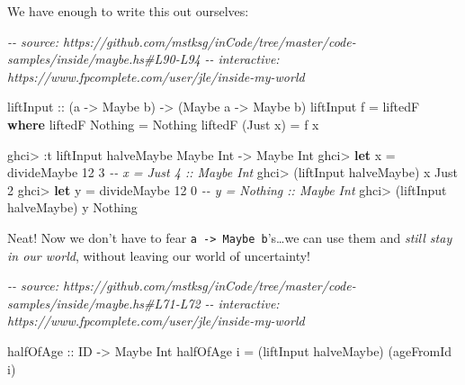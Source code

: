 \documentclass[]{article}
\newenvironment{Shaded}{}{}
\newcommand{\CommentTok}[1]{\textcolor[rgb]{0.38,0.63,0.69}{\textit{#1}}}
\newcommand{\DataTypeTok}[1]{\textcolor[rgb]{0.56,0.13,0.00}{#1}}
\newcommand{\DecValTok}[1]{\textcolor[rgb]{0.25,0.63,0.44}{#1}}
\newcommand{\KeywordTok}[1]{\textcolor[rgb]{0.00,0.44,0.13}{\textbf{#1}}}
\newcommand{\NormalTok}[1]{#1}
\newcommand{\OperatorTok}[1]{\textcolor[rgb]{0.40,0.40,0.40}{#1}}
\newcommand{\OtherTok}[1]{\textcolor[rgb]{0.00,0.44,0.13}{#1}}
\begin{document}
We have enough to write this out ourselves:

\begin{Shaded}
\begin{Highlighting}[]
\CommentTok{{-}{-} source: https://github.com/mstksg/inCode/tree/master/code{-}samples/inside/maybe.hs\#L90{-}L94}
\CommentTok{{-}{-} interactive: https://www.fpcomplete.com/user/jle/inside{-}my{-}world}

\OtherTok{liftInput ::}\NormalTok{ (a }\OtherTok{{-}\textgreater{}} \DataTypeTok{Maybe}\NormalTok{ b) }\OtherTok{{-}\textgreater{}}\NormalTok{ (}\DataTypeTok{Maybe}\NormalTok{ a }\OtherTok{{-}\textgreater{}} \DataTypeTok{Maybe}\NormalTok{ b)}
\NormalTok{liftInput f }\OtherTok{=}\NormalTok{ liftedF}
  \KeywordTok{where}
\NormalTok{    liftedF }\DataTypeTok{Nothing}  \OtherTok{=} \DataTypeTok{Nothing}
\NormalTok{    liftedF (}\DataTypeTok{Just}\NormalTok{ x) }\OtherTok{=}\NormalTok{ f x}
\end{Highlighting}
\end{Shaded}

\begin{Shaded}
\begin{Highlighting}[]
\NormalTok{ghci}\OperatorTok{\textgreater{}} \OperatorTok{:}\NormalTok{t liftInput halveMaybe}
\DataTypeTok{Maybe} \DataTypeTok{Int} \OtherTok{{-}\textgreater{}} \DataTypeTok{Maybe} \DataTypeTok{Int}
\NormalTok{ghci}\OperatorTok{\textgreater{}} \KeywordTok{let}\NormalTok{ x }\OtherTok{=}\NormalTok{ divideMaybe }\DecValTok{12} \DecValTok{3}     \CommentTok{{-}{-} x = Just 4 :: Maybe Int}
\NormalTok{ghci}\OperatorTok{\textgreater{}}\NormalTok{ (liftInput halveMaybe) x}
\DataTypeTok{Just} \DecValTok{2}
\NormalTok{ghci}\OperatorTok{\textgreater{}} \KeywordTok{let}\NormalTok{ y }\OtherTok{=}\NormalTok{ divideMaybe }\DecValTok{12} \DecValTok{0}     \CommentTok{{-}{-} y = Nothing :: Maybe Int}
\NormalTok{ghci}\OperatorTok{\textgreater{}}\NormalTok{ (liftInput halveMaybe) y}
\DataTypeTok{Nothing}
\end{Highlighting}
\end{Shaded}

Neat! Now we don't have to fear \texttt{a\ -\textgreater{}\ Maybe\ b}'s\ldots we
can use them and \emph{still stay in our world}, without leaving our world of
uncertainty!

\begin{Shaded}
\begin{Highlighting}[]
\CommentTok{{-}{-} source: https://github.com/mstksg/inCode/tree/master/code{-}samples/inside/maybe.hs\#L71{-}L72}
\CommentTok{{-}{-} interactive: https://www.fpcomplete.com/user/jle/inside{-}my{-}world}

\OtherTok{halfOfAge ::} \DataTypeTok{ID} \OtherTok{{-}\textgreater{}} \DataTypeTok{Maybe} \DataTypeTok{Int}
\NormalTok{halfOfAge i }\OtherTok{=}\NormalTok{ (liftInput halveMaybe) (ageFromId i)}
\end{Highlighting}
\end{Shaded}
\end{document}
